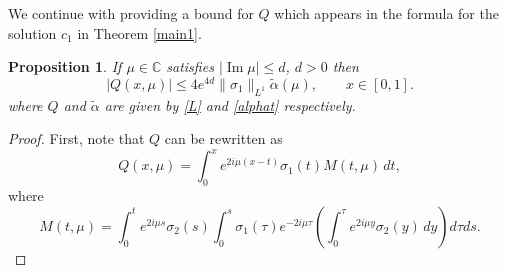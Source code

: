 \documentclass[11pt]{amsart}
\theoremstyle{plain}
\newtheorem{prop}[thm]{Proposition}
\theoremstyle{definition}
\theoremstyle{remark}
\numberwithin{equation}{section}
\renewcommand\Im{\operatorname{Im}}
\begin{document}
We continue with providing a bound for $Q$ which appears in
the formula for the solution $c_1$ in Theorem \ref{main1}.
\begin{prop}\label{int4}
If $\mu \in \mathbb C$ satisfies $|\Im \mu|\le d$, $d>0$
then
\begin{equation}\label{A}
|Q(x,\mu)|\le 4 e^{4d}\|\sigma_1\|_{L^1}\widetilde{\alpha}(\mu),\qquad x \in [0,1].
\end{equation}
where $Q$ and $\tilde{\alpha}$ are given by \eqref{L} and \eqref{alphat} respectively.
\end{prop}

\begin{proof}
First, note that $Q$ can be rewritten as
\begin{equation}\label{LM}
Q(x,\mu)=\int_0^x e^{2i\mu(x-t)}\sigma_1(t)M(t,\mu)\,dt,
\end{equation}
where
\[
M(t,\mu)=\int_0^t e^{2i\mu s} \sigma_2(s)\int_0^s\sigma_1(\tau)e^{-2i\mu \tau}
\left(\int_0^\tau e^{2i\mu y}\sigma_2(y)\,dy\right)
 d\tau ds.
\]


\end{proof}
\end{document}
